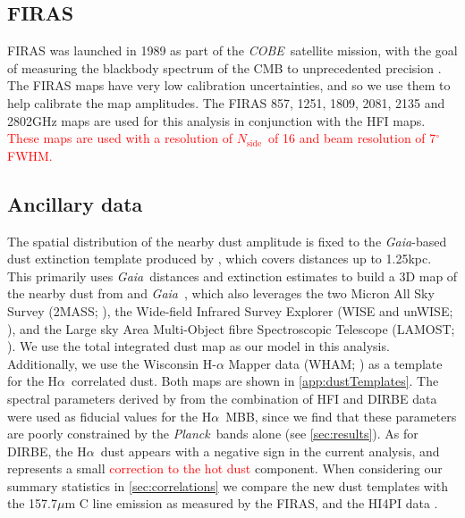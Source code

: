\documentclass{aa}
\makeatletter
\DeclareRobustCommand{\ion}[2]{%
\relax\ifmmode
\ifx\testbx\f@series
{\mathbf{#1\,\mathsc{#2}}}\else
{\mathrm{#1\,\mathsc{#2}}}\fi
\else\textup{#1\,{\mdseries\textsc{#2}}}%
\fi}
\newcommand{\mathsc}[1]{{\normalfont\textsc{#1}}}
\def\Planck{\textit{Planck}}
\def\planck{\textit{Planck}}
\def\COBE{\textit{COBE}}
\def\GAIA{\textit{Gaia}}
\def\Ha{H$\alpha$}
\def\nside{$N_{\mathrm{side}}$}
\def\,{\thinspace}
\newcommand{\edit}[1]{\textcolor{red}{#1}}
\makeatother
\begin{document}
\subsection{FIRAS}
\label{sec:firas}
FIRAS was launched in 1989 as part of the \COBE\ satellite mission, with the goal of measuring the blackbody spectrum of the CMB to unprecedented precision \citep{fixsen1997}. The FIRAS maps have very low calibration uncertainties, and so we use them to help calibrate the map amplitudes. The FIRAS 857, 1251, 1809, 2081, 2135 and 2802\,GHz maps are used for this analysis in conjunction with the HFI maps. \edit{These maps are used with a resolution of \nside\ of 16 and beam resolution of 7$^\circ$ FWHM.} 

\subsection{Ancillary data}
\label{sec:otherdata}
The spatial distribution of the nearby dust amplitude is fixed to the \GAIA-based dust extinction template produced by \citet{edenhofer:2024}, which covers distances up to 1.25\,kpc. This primarily uses \GAIA\ distances and extinction estimates to build a 3D map of the nearby dust from \citet{2023Zhang} and \GAIA\ \citep{2019GAIA,2023gaia}, which also leverages the two Micron All Sky Survey (2MASS; \citealt{2006AJ_2mass}), the Wide-field Infrared Survey Explorer (WISE and unWISE; \citealt{allwise_ES,2010AJ_wise}), and the Large sky Area Multi-Object fibre Spectroscopic Telescope (LAMOST; \citealt{2023yCatp038060301X_lamost,2022A&A_lamost,2022ApJS_lamost,2022yCat_lamost}). We use the total integrated dust map as our model in this analysis. 
Additionally, we use the Wisconsin H-$\alpha$ Mapper data (WHAM; \citealt{wham:2003,2016WHAM}) as a template for the \Ha\ correlated dust. Both maps are shown in \cref{app:dustTemplates}. The spectral parameters derived by \citep{CG02_05} from the combination of HFI and DIRBE data were used as fiducial values for the \Ha\ MBB, since we find that these parameters are poorly constrained by the \planck\ bands alone (see \cref{sec:results}). As for DIRBE, the \Ha\ dust appears with a negative sign in the current analysis, and represents a small \edit{correction to the hot dust} component. %
When considering our summary statistics in \cref{sec:correlations} we compare the new dust templates with the 157.7\,$\mu$m \ion{C}{ii} line emission as measured by the FIRAS, and the HI4PI data \citep{HI4PI2016}. 
\end{document}
